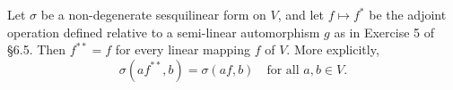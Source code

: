 Let $\sigma$ be a non-degenerate sesquilinear form on $V$, and let $f \mapsto f^*$ be the adjoint operation defined relative to a semi-linear automorphism $g$ as in Exercise 5 of §6.5. Then $f^{**} = f$ for every linear mapping $f$ of $V$. More explicitly,
$$\sigma(af^{**}, b) = \sigma(af, b) \quad \text{for all } a, b \in V.$$
